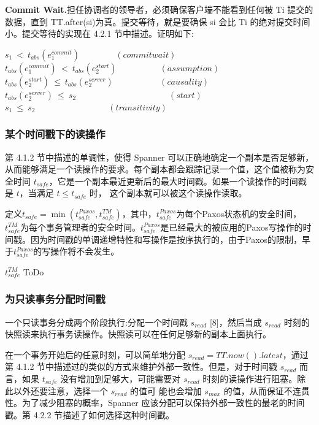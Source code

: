 \documentclass[letterpaper,twocolumn,10pt]{article}
\begin{document}
\textbf{Commit Wait.}担任协调者的领导者，必须确保客户端不能看到任何被 Ti 提交的数据，直到 TT.after(si)为真。提交等待，就是要确保 si 会比 Ti 的绝对提交时间小。提交等待的实现在 4.2.1 节中描述。证明如下:

\begin{flushright}
$s_{1} \  < \ t_{abs}(e_{1}^{commit})  \, \quad \quad \quad \quad (commit wait)$ \\
$t_{abs}(e_{1}^{commit}) \ < \ t_{abs}(e_{2}^{start}) \quad \quad \quad \quad \quad (assumption)$ \\
$t_{abs}(e_{2}^{start})  \ \le \ t_{abs}(e_{2}^{server}) \, \ \quad \quad \quad \quad \quad (causality)$ \\
$t_{abs}(e_{2}^{server}) \  \le \ s_{2} \, \, \ \ \quad \quad  \quad \quad \quad \quad \quad \quad \quad \quad (start)$ \\
$s_{1}  \  \le \ s_{2}  \,  \, \, \quad \quad \quad \quad \quad \quad \quad \quad (transitivity)$ \\
\end{flushright}

\subsubsection{某个时间戳下的读操作}
第 4.1.2 节中描述的单调性，使得 Spanner 可以正确地确定一个副本是否足够新，从而能够满足一个读操作的要求。每个副本都会跟踪记录一个值，这个值被称为安全时间 $t_{safe}$，它是一个副本最近更新后的最大时间戳。如果一个读操作的时间戳是 $t$，当满足 $t \leq t_{safe}$ 时， 这个副本就可以被这个读操作读取。

定义$t_{safe} = \min{(t_{safe}^{Paxos}, t_{safe}^{TM})}$，其中，$t_{safe}^{Paxos}$为每个Paxos状态机的安全时间，$ t_{safe}^{TM}$为每个事务管理者的安全时间。$t_{safe}^{Paxos}$是已经最大的被应用的Paxos写操作的时间戳。因为时间戳的单调递增特性和写操作是按序执行的，由于Paxos的限制，早于$t_{safe}^{Paxos}$的写操作将不会发生。

$ t_{safe}^{TM}$ ToDo

\subsubsection{为只读事务分配时间戳}
一个只读事务分成两个阶段执行:分配一个时间戳 $s_{read}$ [8]，然后当成  $s_{read}$ 时刻的快照读来执行事务读操作。快照读可以在任何足够新的副本上面执行。

在一个事务开始后的任意时刻，可以简单地分配 $s_{read} = TT.now().latest$，通过第 4.1.2 节中描述过的类似的方式来维护外部一致性。但是，对于时间戳 $s_{read}$ 而言，如果 $t_{safe}$ 没有增加到足够大，可能需要对 $s_{read}$ 时刻的读操作进行阻塞。除此以外还要注意，选择一个 $s_{read}$ 的值可 能也会增加 $s_{max}$ 的值，从而保证不连贯性。为了减少阻塞的概率，Spanner 应该分配可以保持外部一致性的最老的时间戳。第 4.2.2 节描述了如何选择这种时间戳。
\end{document}
